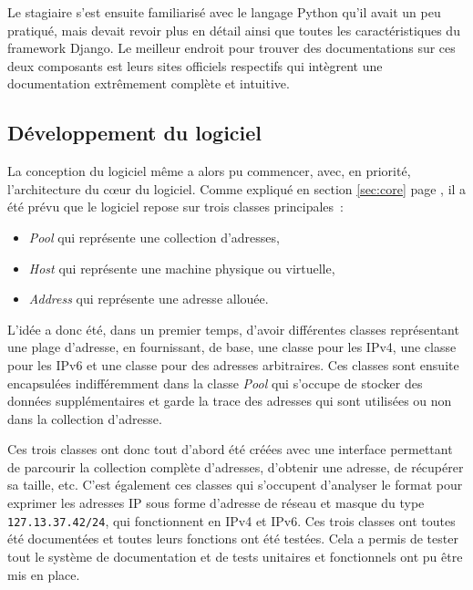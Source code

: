 \documentclass[12pt,a4paper,twoside]{report}
\begin{document}
Le stagiaire s’est ensuite familiarisé avec le langage Python qu’il avait un
peu pratiqué, mais devait revoir plus en détail ainsi que toutes les
caractéristiques du framework Django. Le meilleur endroit pour trouver des
documentations sur ces deux composants est leurs sites officiels respectifs qui
intègrent une documentation extrêmement complète et intuitive.

\subsection{Développement du logiciel}

La conception du logiciel même a alors pu commencer, avec, en priorité,
l’architecture du cœur du logiciel. Comme expliqué en section \ref{sec:core}
page \pageref{sec:core}, il a été prévu que le logiciel repose sur trois
classes principales~:

\begin{itemize}
	\item \emph{Pool} qui représente une collection d’adresses,
	\item \emph{Host} qui représente une machine physique ou virtuelle,
	\item \emph{Address} qui représente une adresse allouée.
\end{itemize}

L’idée a donc été, dans un premier temps, d’avoir différentes classes
représentant une plage d’adresse, en fournissant, de base, une classe pour les
IPv4, une classe pour les IPv6 et une classe pour des adresses arbitraires. Ces
classes sont ensuite encapsulées indifféremment dans la classe \emph{Pool} qui
s’occupe de stocker des données supplémentaires et garde la trace des adresses
qui sont utilisées ou non dans la collection d’adresse.

Ces trois classes ont donc tout d’abord été créées avec une interface
permettant de parcourir la collection complète d’adresses, d’obtenir une
adresse, de récupérer sa taille, etc. C’est également ces classes qui
s’occupent d’analyser le format pour exprimer les adresses IP sous forme
d’adresse de réseau et masque du type \verb+127.13.37.42/24+, qui fonctionnent
en IPv4 et IPv6. Ces trois classes ont toutes été documentées et toutes leurs
fonctions ont été testées. Cela a permis de tester tout le système de
documentation et de tests unitaires et fonctionnels ont pu être mis en place.
\end{document}
